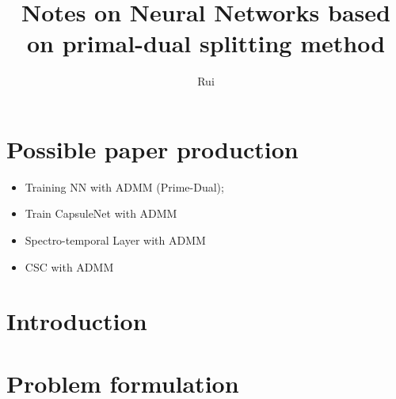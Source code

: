 \documentclass[11pt,a4paper]{article}
\title{Notes on Neural Networks based on primal-dual splitting method }
\author{Rui}
\begin{document}
\maketitle

\tableofcontents
\section{Possible paper production}
\begin{itemize}
	\item Training NN with ADMM (Prime-Dual); 
	\item Train CapsuleNet with ADMM
	\item Spectro-temporal Layer with ADMM
	\item CSC with ADMM
\end{itemize}
\section{Introduction}

\section{Problem formulation}
\end{document}
